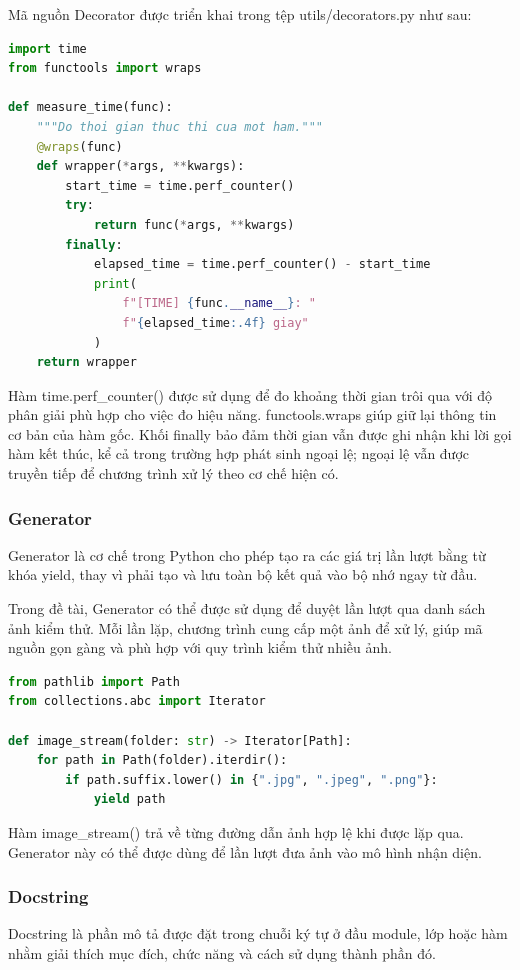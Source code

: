 \documentclass[a4paper,13pt]{extarticle}
\begin{document}
Mã nguồn Decorator được triển khai trong tệp utils/decorators.py như sau:

\begin{lstlisting}[language=Python, caption={Ví dụ về hàm đo thời gian sử dụng Decorator}]
import time
from functools import wraps

def measure_time(func):
    """Do thoi gian thuc thi cua mot ham."""
    @wraps(func)
    def wrapper(*args, **kwargs):
        start_time = time.perf_counter()
        try:
            return func(*args, **kwargs)
        finally:
            elapsed_time = time.perf_counter() - start_time
            print(
                f"[TIME] {func.__name__}: "
                f"{elapsed_time:.4f} giay"
            )
    return wrapper

\end{lstlisting}
Hàm time.perf\_counter() được sử dụng để đo khoảng thời gian trôi qua với độ phân giải phù hợp cho việc đo hiệu năng. functools.wraps giúp giữ lại thông tin cơ bản của hàm gốc. Khối finally bảo đảm thời gian vẫn được ghi nhận khi lời gọi hàm kết thúc, kể cả trong trường hợp phát sinh ngoại lệ; ngoại lệ vẫn được truyền tiếp để chương trình xử lý theo cơ chế hiện có.

\subsubsection{Generator}
Generator là cơ chế trong Python cho phép tạo ra các giá trị lần lượt bằng từ khóa {yield}, thay vì phải tạo và lưu toàn bộ kết quả vào bộ nhớ ngay từ đầu.

Trong đề tài, Generator có thể được sử dụng để duyệt lần lượt qua danh sách ảnh kiểm thử. Mỗi lần lặp, chương trình cung cấp một ảnh để xử lý, giúp mã nguồn gọn gàng và phù hợp với quy trình kiểm thử nhiều ảnh.

\begin{lstlisting}[language=Python, caption={Ví dụ về Generator duyệt danh sách ảnh}]
from pathlib import Path
from collections.abc import Iterator

def image_stream(folder: str) -> Iterator[Path]:
    for path in Path(folder).iterdir():
        if path.suffix.lower() in {".jpg", ".jpeg", ".png"}:
            yield path
\end{lstlisting}

Hàm {image\_stream()} trả về từng đường dẫn ảnh hợp lệ khi được lặp qua. Generator này có thể được dùng để lần lượt đưa ảnh vào mô hình nhận diện.

\subsubsection{Docstring}
Docstring là phần mô tả được đặt trong chuỗi ký tự ở đầu module, lớp hoặc hàm nhằm giải thích mục đích, chức năng và cách sử dụng thành phần đó.
\end{document}
